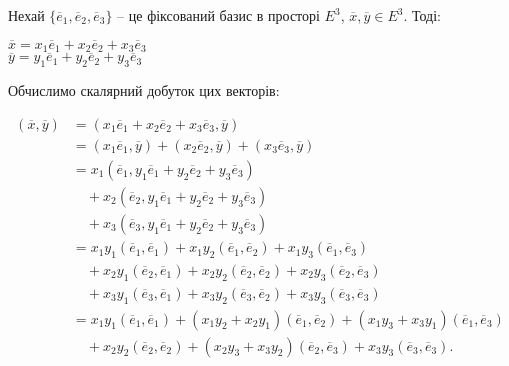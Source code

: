 Нехай $\{\overline{e}_1, \overline{e}_2, \overline{e}_3\}$ – це фіксований базис в просторі $E^3$,
$\overline{x}, \overline{y} \in E^3$. Тоді:
\begin{center}
	$\overline{x} = x_1\overline{e}_1 + x_2\overline{e}_2 + x_3\overline{e}_3$  \\
	$\overline{y} = y_1\overline{e}_1 + y_2\overline{e}_2 + y_3\overline{e}_3$  \\
\end{center}

Обчислимо скалярний добуток цих векторів: 

\begin{equation*}
    \begin{split}
        (\overline{x}, \overline{y})
        & = (x_1\overline{e}_1 + x_2\overline{e}_2 + x_3\overline{e}_3, \overline{y})\\
        & = (x_1 \overline{e}_1, \overline{y}) + (x_2 \overline{e}_2, \overline{y})
        + (x_3 \overline{e}_3, \overline{y})\\
        & = x_1(\overline{e}_1, y_1\overline{e}_1 + y_2\overline{e}_2 + y_3\overline{e}_3)\\
        & \quad + x_2(\overline{e}_2, y_1\overline{e}_1 + y_2\overline{e}_2 + y_3\overline{e}_3)\\
        & \quad+ x_3(\overline{e}_3, y_1\overline{e}_1 + y_2\overline{e}_2 + y_3\overline{e}_3)\\
        & = x_1 y_1(\overline{e}_1, \overline{e}_1)
        + x_1 y_2(\overline{e}_1, \overline{e}_2)
        + x_1 y_3(\overline{e}_1, \overline{e}_3)\\
        & \quad+ x_2 y_1(\overline{e}_2, \overline{e}_1)
        + x_2 y_2(\overline{e}_2, \overline{e}_2)
        + x_2 y_3(\overline{e}_2, \overline{e}_3)\\
        & \quad+ x_3 y_1(\overline{e}_3, \overline{e}_1)
        + x_3 y_2(\overline{e}_3, \overline{e}_2)
        + x_3 y_3(\overline{e}_3, \overline{e}_3)\\
        & = x_1 y_1(\overline{e}_1, \overline{e}_1)
        + (x_1 y_2 + x_2 y_1)(\overline{e}_1, \overline{e}_2)
        + (x_1 y_3 + x_3 y_1)(\overline{e}_1, \overline{e}_3)\\
        & \quad+ x_2 y_2(\overline{e}_2, \overline{e}_2)
        + (x_2 y_3 + x_3 y_2)(\overline{e}_2, \overline{e}_3)
        + x_3 y_3(\overline{e}_3, \overline{e}_3).\\
    \end{split}    
\end{equation*}

